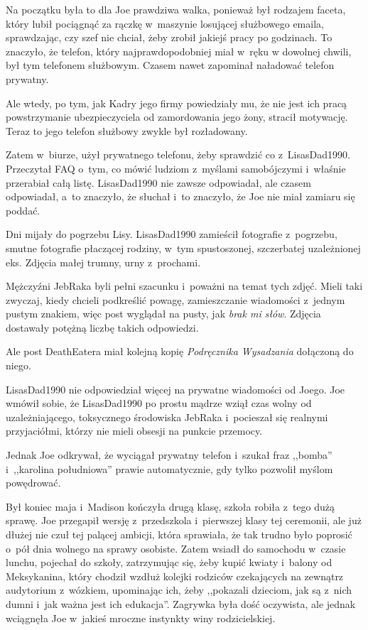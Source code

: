 \documentclass[oneside,polish,11pt,sfheadings]{mwbk}
\begin{document}
Na początku była to dla Joe prawdziwa walka, ponieważ był rodzajem
faceta, który lubił pociągnąć za rączkę w~maszynie losującej służbowego
emaila, sprawdzając, czy szef nie chciał, żeby zrobił jakiejś pracy po
godzinach. To znaczyło, że telefon, który najprawdopodobniej miał w~ręku
w dowolnej chwili, był tym telefonem służbowym. Czasem nawet zapominał
naładować telefon prywatny.

Ale wtedy, po tym, jak Kadry jego firmy powiedziały mu, że nie jest ich
pracą powstrzymanie ubezpieczyciela od zamordowania jego żony, stracił
motywację. Teraz to jego telefon służbowy zwykle był rozładowany.

Zatem w~biurze, użył prywatnego telefonu, żeby sprawdzić co z~LisasDad1990. Przeczytał FAQ o~tym, co mówić ludziom z~myślami
samobójczymi i~właśnie przerabiał całą listę. LisasDad1990 nie zawsze
odpowiadał, ale czasem odpowiadał, a~to znaczyło, że słuchał i~to
znaczyło, że Joe nie miał zamiaru się poddać.

Dni mijały do pogrzebu Lisy. LisasDad1990 zamieścił fotografie z~pogrzebu, smutne fotografie płaczącej rodziny, w~tym spustoszonej,
szczerbatej uzależnionej eks. Zdjęcia małej trumny, urny z~prochami.

Mężczyźni JebRaka byli pełni szacunku i~poważni na temat tych zdjęć.
Mieli taki zwyczaj, kiedy chcieli podkreślić powagę, zamieszczanie
wiadomości z~jednym pustym znakiem, więc post wyglądał na pusty, jak
\textit{brak mi słów}. Zdjęcia dostawały potężną liczbę takich odpowiedzi.

Ale post DeathEatera miał kolejną kopię \textit{Podręcznika Wysadzania}
dołączoną do niego.

LisasDad1990 nie odpowiedział więcej na prywatne wiadomości od Joego.
Joe wmówił sobie, że LisasDad1990 po prostu mądrze wziął czas wolny od
uzależniającego, toksycznego środowiska JebRaka i~pocieszał się realnymi
przyjaciółmi, którzy nie mieli obsesji na punkcie przemocy.

Jednak Joe odkrywał, że wyciągał prywatny telefon i~szukał fraz
,,bomba'' i~,,karolina południowa'' prawie automatycznie, gdy tylko
pozwolił myślom powędrować.

Był koniec maja i~Madison kończyła drugą klasę, szkoła robiła z~tego
dużą sprawę. Joe przegapił wersję z~przedszkola i~pierwszej klasy tej
ceremonii, ale już dłużej nie czuł tej palącej ambicji, która sprawiała,
że tak trudno było poprosić o~pół dnia wolnego na sprawy osobiste. Zatem
wsiadł do samochodu w~czasie lunchu, pojechał do szkoły, zatrzymując
się, żeby kupić kwiaty i~balony od Meksykanina, który chodził wzdłuż
kolejki rodziców czekających na zewnątrz audytorium z~wózkiem,
upominając ich, żeby ,,pokazali dzieciom, jak są z~nich dumni i~jak
ważna jest ich edukacja''. Zagrywka była dość oczywista, ale jednak
wciągnęła Joe w~jakieś mroczne instynkty winy rodzicielskiej.
\end{document}

